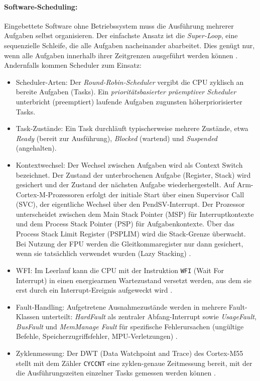 \paragraph{Software-Scheduling:}
Eingebettete Software ohne Betriebssystem muss die Ausführung mehrerer Aufgaben selbst organisieren. Der einfachste Ansatz ist die \textit{Super-Loop}, eine sequenzielle Schleife, die alle Aufgaben nacheinander abarbeitet. Dies genügt nur, wenn alle Aufgaben innerhalb ihrer Zeitgrenzen ausgeführt werden können \cite[Kap. 2.5]{yiuDefinitiveGuideARM2013}. Andernfalls kommen Scheduler zum Einsatz:
\begin{itemize}
    \item Scheduler-Arten: Der \textit{Round-Robin-Scheduler} vergibt die CPU zyklisch an bereite Aufgaben (Tasks). Ein \textit{prioritätsbasierter präemptiver Scheduler} unterbricht (preemptiert) laufende Aufgaben zugunsten höherpriorisierter Tasks.
    \item Task-Zustände: Ein Task durchläuft typischerweise mehrere Zustände, etwa \textit{Ready} (bereit zur Ausführung), \textit{Blocked} (wartend) und \textit{Suspended} (angehalten).
    \item Kontextwechsel: Der Wechsel zwischen Aufgaben wird als Context Switch bezeichnet. Der Zustand der unterbrochenen Aufgabe (Register, Stack) wird gesichert und der Zustand der nächsten Aufgabe wiederhergestellt. Auf Arm-Cortex-M-Prozessoren erfolgt der initiale Start über einen Supervisor Call (SVC), der eigentliche Wechsel über den PendSV-Interrupt. Der Prozessor unterscheidet zwischen dem Main Stack Pointer (MSP) für Interruptkontexte und dem Process Stack Pointer (PSP) für Aufgabenkontexte. Über das Process Stack Limit Register (PSPLIM) wird die Stack-Grenze überwacht. Bei Nutzung der FPU werden die Gleitkommaregister nur dann gesichert, wenn sie tatsächlich verwendet wurden (Lazy Stacking) \cite[S. 28 ff.]{valvanoRealtimeOperatingSystems2017}.
    \item WFI: Im Leerlauf kann die CPU mit der Instruktion \texttt{WFI} (Wait For Interrupt) in einen energiearmen Wartezustand versetzt werden, aus dem sie erst durch ein Interrupt-Ereignis aufgeweckt wird \cite[S. ~369]{rm0486}.
    \item Fault-Handling: Aufgetretene Ausnahmezustände werden in mehrere Fault-Klassen unterteilt: \textit{HardFault} als zentraler Abfang-Interrupt sowie \textit{UsageFault}, \textit{BusFault} und \textit{MemManage Fault} für spezifische Fehlerursachen (ungültige Befehle, Speicherzugriffsfehler, MPU-Verletzungen) \cite[Kap. ~12]{yiuDefinitiveGuideARM2013}.
    \item Zyklenmessung: Der DWT (Data Watchpoint and Trace) des Cortex-M55 stellt mit dem Zähler \texttt{CYCCNT} eine zyklen-genaue Zeitmessung bereit, mit der die Ausführungszeiten einzelner Tasks gemessen werden können \cite[S. ~4422]{rm0486}.
\end{itemize}


